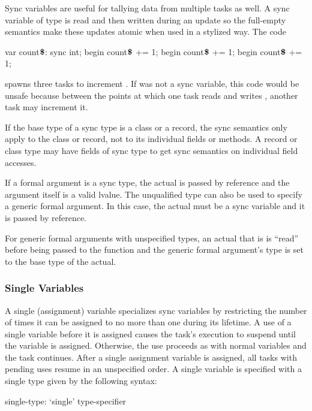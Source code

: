 \begin{example}
Sync variables are useful for tallying data from multiple tasks as
well.  A sync variable of type  is read and then written
during an update so the full-empty semantics make these updates atomic
when used in a stylized way.  The code
\begin{chapel}
var count$\mbox{{\bf \$}}$: sync int;
begin count$\mbox{{\bf \$}}$ += 1;
begin count$\mbox{{\bf \$}}$ += 1;
begin count$\mbox{{\bf \$}}$ += 1;
\end{chapel}
spawns three tasks to increment .
If  was not a sync variable, this code
would be unsafe because between the points at which one task
reads  and
writes , another task may increment it.
\end{example}

If the base type of a sync type is a class or a record, the sync
semantics only apply to the class or record, not to its individual
fields or methods.  A record or class type may have fields of sync
type to get sync semantics on individual field accesses.

If a formal argument is a sync type, the actual is passed by reference
and the argument itself is a valid lvalue.  The unqualified
type  can also be used to specify a generic formal
argument.  In this case, the actual must be a sync variable and it is
passed by reference.

For generic formal arguments with unspecified types, an actual that
is  is ``read'' before being passed to the function and the
generic formal argument's type is set to the base type of the actual.

\subsubsection{Single Variables}
\label{Single_Variables}

A single (assignment) variable specializes sync variables by
restricting the number of times it can be assigned to no more than one
during its lifetime.  A use of a single variable before it is assigned
causes the task's execution to suspend until the variable is assigned.
Otherwise, the use proceeds as with normal variables and the task
continues.  After a single assignment variable is assigned, all tasks
with pending uses resume in an unspecified order.  A single variable
is specified with a single type given by the following syntax:
\begin{syntax}
single-type:
  `single' type-specifier
\end{syntax}

